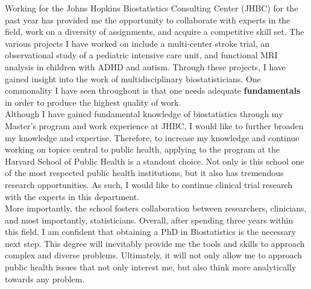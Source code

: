 \documentclass[12pt]{article}
\begin{document}
Working for the Johns Hopkins Biostatistics Consulting Center (JHBC) for the past year has provided me the opportunity to collaborate with experts in the field, work on a diversity of assignments, and acquire a competitive skill set. The various projects I have worked on include a multi-center stroke trial, an observational study of a pediatric intensive care unit, and functional MRI analysis in children with ADHD and autism. Through these projects, I have gained insight into the work of multidisciplinary biostatisticians. One commonality I have seen throughout is that one needs adequate \textbf{fundamentals} in order to produce the highest quality of work. \\

Although I have gained fundamental knowledge of biostatistics through my Master's program and work experience at JHBC, I would like to further broaden my knowledge and expertise. Therefore, to increase my knowledge and continue working on topics central to public health, applying to the program at the Harvard School of Public Health is a standout choice. Not only is this school one of the most respected public health institutions, but  it also has tremendous research opportunities.  As such, I would like to continue clinical trial research with the experts in this department.  \\

More importantly, the school fosters collaboration between researchers, clinicians, and most importantly, statisticians.  Overall, after spending three years within this field, I am confident that obtaining a PhD in Biostatistics is the necessary next step. This degree will inevitably provide me the tools and skills to approach complex and diverse problems. Ultimately, it will not only allow me to approach public health issues that not only interest me, but also think more analytically towards any problem.
\end{document}
